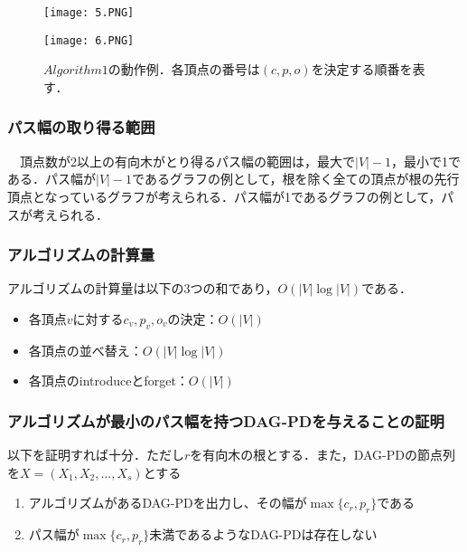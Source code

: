 \documentclass{kuisthesis}           %
\begin{document}
     
 
 \begin{figure}[htbp]
  \begin{minipage}[b]{.5\linewidth}
    \centering
    \texttt{[image: 5.PNG]}
  \end{minipage}%
  \begin{minipage}[b]{.5\linewidth}
    \centering
    \texttt{[image: 6.PNG]}
  \end{minipage}
  \caption{$Algorithm1$の動作例．各頂点の番号は$(c, p, o)$を決定する順番を表す．}
  \label{fig:5}
 \end{figure}


 \subsubsection{パス幅の取り得る範囲}

　頂点数が2以上の有向木がとり得るパス幅の範囲は，最大で$|V|-1$，最小で1である．パス幅が$|V|-1$であるグラフの例として，根を除く全ての頂点が根の先行頂点となっているグラフが考えられる．パス幅が1であるグラフの例として，パスが考えられる．

 \subsubsection{アルゴリズムの計算量}

 アルゴリズムの計算量は以下の3つの和であり，$O(|V| \log |V|)$である．

 \begin{itemize}
     \item 各頂点$v$に対する$c_v, p_v, o_v$の決定：$O(|V|)$
     \item 各頂点の並べ替え：$O(|V| \log |V|)$
     \item 各頂点のintroduceとforget：$O(|V|)$
 \end{itemize}
 
 \subsubsection{アルゴリズムが最小のパス幅を持つDAG-PDを与えることの証明}
 以下を証明すれば十分．ただし$r$を有向木の根とする．また，DAG-PDの節点列を$X=(X_1, X_2,   \ldots, X_s)$とする
 
 \begin{enumerate}
 \item アルゴリズムがあるDAG-PDを出力し、その幅が$ \max\{c_r, p_r\}$である
 \item パス幅が$ \max\{c_r, p_r\}$未満であるようなDAG-PDは存在しない
 \end{enumerate}
\end{document}
